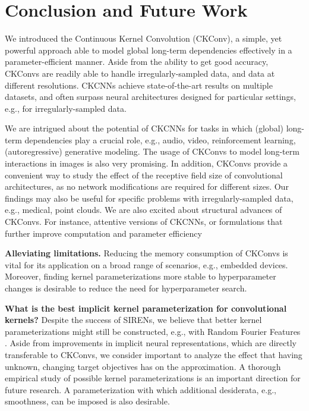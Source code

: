 \documentclass{article}
\begin{document}
\vspace{-2mm}
\section{Conclusion and Future Work}
\vspace{-2mm}
We introduced the Continuous Kernel Convolution (CKConv), a simple, yet powerful approach able to model global long-term dependencies effectively in a parameter-efficient manner. Aside from the ability to get good accuracy, CKConvs are readily able to handle irregularly-sampled data, and data at different resolutions. CKCNNs achieve state-of-the-art results on multiple datasets, and often surpass neural architectures designed for particular settings, e.g., for irregularly-sampled data. 

We are intrigued about the potential of CKCNNs for tasks in which (global) long-term dependencies play a crucial role, e.g., audio, video, reinforcement learning, (autoregressive) generative modeling. The usage of CKConvs to model long-term interactions in images is also very promising.
 In addition, CKConvs provide a convenient way to study the effect of the receptive field size of convolutional architectures, as no network modifications are required for different sizes. Our findings may also be useful for specific problems with irregularly-sampled data, e.g., medical, point clouds. We are also excited about structural advances of CKConvs. For instance, attentive versions of CKCNNs, or formulations that further improve computation and parameter efficiency

 \textbf{Alleviating limitations.} Reducing the memory consumption of CKConvs is vital for its application on a broad range of scenarios, e.g., embedded devices. Moreover, finding kernel parameterizations more stable to hyperparameter changes is desirable to reduce the need for hyperparameter search.
 
 \textbf{What is the best implicit kernel parameterization for convolutional kernels?} Despite the success of SIRENs, we believe that better kernel parameterizations might still be constructed, e.g., with Random Fourier Features \citep{tancik2020fourier}. Aside from improvements in implicit neural representations, which are directly transferable to CKConvs, we consider important to analyze the effect that having unknown, changing target objectives has on the approximation. A thorough empirical study of possible kernel parameterizations is an important direction for future research. A parameterization with which additional desiderata, e.g., smoothness, can be imposed is also desirable.
\newpage
\end{document}
